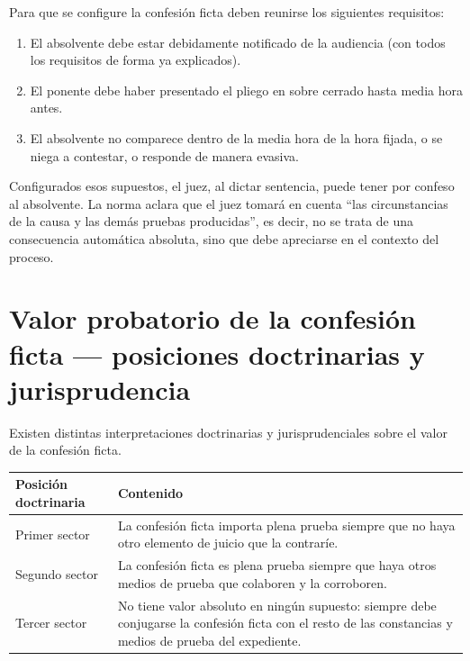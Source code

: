 \documentclass[12pt,oneside]{book}
\begin{document}
Para que se configure la confesión ficta deben reunirse los siguientes requisitos:

\begin{enumerate}
    \item El absolvente debe estar debidamente notificado de la audiencia (con todos los requisitos de forma ya explicados).
    \item El ponente debe haber presentado el pliego en sobre cerrado hasta media hora antes.
    \item El absolvente no comparece dentro de la media hora de la hora fijada, o se niega a contestar, o responde de manera evasiva.
\end{enumerate}

Configurados esos supuestos, el juez, al dictar sentencia, puede tener por confeso al absolvente. La norma aclara que el juez tomará en cuenta ``las circunstancias de la causa y las demás pruebas producidas'', es decir, no se trata de una consecuencia automática absoluta, sino que debe apreciarse en el contexto del proceso.

\section{Valor probatorio de la confesión ficta --- posiciones doctrinarias y jurisprudencia}

Existen distintas interpretaciones doctrinarias y jurisprudenciales sobre el valor de la confesión ficta.

\begin{table}[H]
\centering
\begin{tabularx}{\textwidth}{
    >{\raggedright\arraybackslash}p{}
    >{\raggedright\arraybackslash}X
}
\toprule
\textbf{Posición doctrinaria} & \textbf{Contenido} \\
\midrule
Primer sector & La confesión ficta importa plena prueba siempre que no haya otro elemento de juicio que la contraríe. \\
Segundo sector & La confesión ficta es plena prueba siempre que haya otros medios de prueba que colaboren y la corroboren. \\
Tercer sector & No tiene valor absoluto en ningún supuesto: siempre debe conjugarse la confesión ficta con el resto de las constancias y medios de prueba del expediente. \\
\bottomrule
\end{tabularx}
\end{table}
\end{document}
